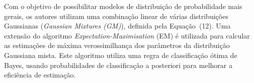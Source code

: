 \documentclass[a4paper,titlepage]{article}
\begin{document}
\begin{center}
  \vspace{1em}
  \vspace{1em}
\end{center}

Com o objetivo de possibilitar modelos de distribuição de probabilidade mais
gerais, os autores utilizam uma combinação linear de várias distribuições
Gaussianas (\textit{Gaussian Mixtures (GM)}), definida pela Equação~(12).
Uma extensão do algoritmo \textit{Expectation-Maximisation} (EM) é utilizada
para calcular as estimações de máxima verossimilhança dos parâmetros da
distribuição Gaussiana mista. Este algoritmo utiliza uma regra de classificação
ótima de Bayes, usando probabilidades de classificação a posteriori para melhorar
a eficiência de estimação.

\begin{center}
  \vspace{1em}
  \vspace{1em}
\end{center}
\end{document}
